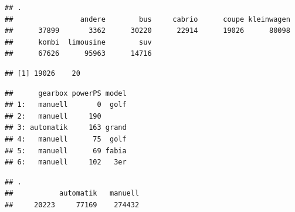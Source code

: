 \documentclass[]{book}
\newenvironment{Shaded}{\begin{snugshade}}{\end{snugshade}}
\newcommand{\CommentTok}[1]{\textcolor[rgb]{0.56,0.35,0.01}{\textit{#1}}}
\newcommand{\NormalTok}[1]{#1}
\newcommand{\OperatorTok}[1]{\textcolor[rgb]{0.81,0.36,0.00}{\textbf{#1}}}
\newcommand{\StringTok}[1]{\textcolor[rgb]{0.31,0.60,0.02}{#1}}
\theoremstyle{definition}
\theoremstyle{definition}
\theoremstyle{definition}
\theoremstyle{remark}
\begin{document}
\begin{verbatim}
## .
##                andere        bus     cabrio      coupe kleinwagen 
##      37899       3362      30220      22914      19026      80098 
##      kombi  limousine        suv 
##      67626      95963      14716
\end{verbatim}

\begin{Shaded}
\end{Shaded}

\begin{verbatim}
## [1] 19026    20
\end{verbatim}

\begin{Shaded}
\end{Shaded}

\begin{verbatim}
##      gearbox powerPS model
## 1:   manuell       0  golf
## 2:   manuell     190      
## 3: automatik     163 grand
## 4:   manuell      75  golf
## 5:   manuell      69 fabia
## 6:   manuell     102   3er
\end{verbatim}

\begin{Shaded}
\end{Shaded}

\begin{verbatim}
## .
##           automatik   manuell 
##     20223     77169    274432
\end{verbatim}

\begin{Shaded}
\end{Shaded}
\end{document}
